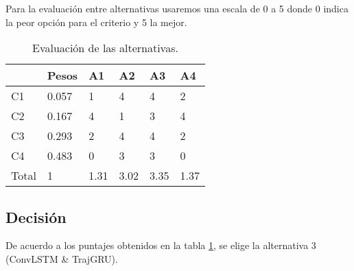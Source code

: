 Para la evaluación entre alternativas usaremos una escala de 0 a 5 donde 0 
indica la peor opción para el criterio y 5 la mejor.

\begin{table}[H]
  \centering
  \caption{Evaluación de las alternativas.}
  \begin{tabular}{l|l|llll}
        & Pesos & A1   & A2   & A3   & A4   \\ \hline
  C1    & 0.057 & 1    & 4    & 4    & 2    \\
  C2    & 0.167 & 4    & 1    & 3    & 4    \\
  C3    & 0.293 & 2    & 4    & 4    & 2    \\
  C4    & 0.483 & 0    & 3    & 3    & 0    \\ \hline
  Total & 1     & 1.31 & 3.02 & 3.35 & 1.37
  \end{tabular}
  \label{tab:evaluacion}

\end{table}

\subsection{Decisión}

De acuerdo a los puntajes obtenidos en la tabla \ref{tab:evaluacion}, se elige 
la alternativa 3 (ConvLSTM \& TrajGRU).
